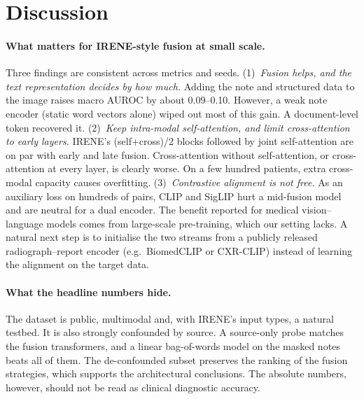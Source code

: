 \section{Discussion}
\paragraph{What matters for IRENE-style fusion at small scale.}
Three findings are consistent across metrics and seeds.
(1)~\emph{Fusion helps, and the text representation decides by how much.} Adding the note
and structured data to the image raises macro AUROC by about 0.09--0.10. However, a weak note
encoder (static word vectors alone) wiped out most of this gain. A document-level token
recovered it.
(2)~\emph{Keep intra-modal self-attention, and limit cross-attention to early layers.}
IRENE's (self+cross)/2 blocks followed by joint self-attention are on par with early and
late fusion. Cross-attention without self-attention, or cross-attention at every layer, is
clearly worse. On a few hundred patients, extra cross-modal capacity causes overfitting.
(3)~\emph{Contrastive alignment is not free.} As an auxiliary loss on hundreds of pairs,
CLIP and SigLIP hurt a mid-fusion model and are neutral for a dual encoder. The benefit reported
for medical vision--language models comes from large-scale pre-training, which our setting
lacks. A natural next step is to initialise the two streams from a publicly released
radiograph--report encoder (e.g.\ BiomedCLIP or CXR-CLIP) instead of learning the alignment
on the target data.

\paragraph{What the headline numbers hide.} The dataset is public, multimodal and, with IRENE's
input types, a natural testbed. It is also strongly confounded by source. A source-only probe
matches the fusion transformers, and a linear bag-of-words model on the masked notes beats all
of them. The de-confounded subset preserves the ranking of the fusion strategies, which supports
the architectural conclusions. The absolute numbers, however, should not be read as clinical
diagnostic accuracy.

